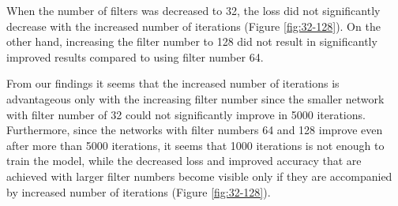 \documentclass [a4paper, 11pt] {article}
\begin{document}
\begin{enumerate}
When the number of filters was decreased to 32, the loss did not significantly decrease with the increased number of iterations (Figure \ref{fig:32-128}). On the other hand, increasing the filter number to 128 did not result in significantly improved results compared to using filter number 64.

From our findings it seems that the increased number of iterations is advantageous only with the increasing filter number since the smaller network with filter number of 32 could not significantly improve in 5000 iterations. Furthermore, since the networks with filter numbers 64 and 128 improve even after more than 5000 iterations, it seems that 1000 iterations is not enough to train the model, while the decreased loss and improved accuracy that are achieved with larger filter numbers become visible only if they are accompanied by increased number of iterations (Figure \ref{fig:32-128}).


\end{enumerate}
\end{document}
